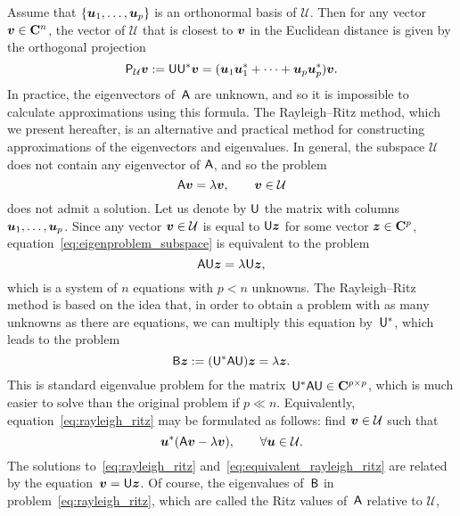 Assume that $\{\mathbf{\boldsymbol{u}}_1, \dotsc, \mathbf{\boldsymbol{u}}_p\}$ is an orthonormal basis of $\mathcal U$.
Then for any vector $\mathbf{\boldsymbol{v}} \in \mathbf C^{n}$,
the vector of $\mathcal U$ that is closest to $\mathbf{\boldsymbol{v}}$ in the Euclidean distance is given by the orthogonal projection
\[
    \mathsf P_{\mathcal U} \mathbf{\boldsymbol{v}} := \mathsf U \mathsf U^* \mathbf{\boldsymbol{v}} = (\mathbf{\boldsymbol{u}}_1 \mathbf{\boldsymbol{u}}_1^* + \dotsb + \mathbf{\boldsymbol{u}}_p \mathbf{\boldsymbol{u}}_p^*) \mathbf{\boldsymbol{v}}.
\]
In practice,
the eigenvectors of~$\mathsf A$ are unknown,
and so it is impossible to calculate approximations using this formula.
The Rayleigh--Ritz method,
which we present hereafter,
is an alternative and practical method for constructing approximations of the eigenvectors and eigenvalues.
In general, the subspace $\mathcal U$ does not contain any eigenvector of $\mathsf A$,
and so the problem
\begin{equation}
    \label{eq:eigenproblem_subspace}
    \mathsf A \mathbf{\boldsymbol{v}} = \lambda \mathbf{\boldsymbol{v}}, \qquad \mathbf{\boldsymbol{v}} \in \mathcal U
\end{equation}
does not admit a solution.
Let us denote by $\mathsf U$ the matrix with columns~$\mathbf{\boldsymbol{u}}_1, \dotsc, \mathbf{\boldsymbol{u}}_p$.
Since any vector $\mathbf{\boldsymbol{v}} \in \mathcal U$ is equal to $\mathsf U \mathbf{\boldsymbol{z}}$ for some vector $\mathbf{\boldsymbol{z}} \in \mathbf C^p$,
equation~\eqref{eq:eigenproblem_subspace} is equivalent to the problem
\[
    \mathsf A \mathsf U \mathbf{\boldsymbol{z}} = \lambda \mathsf U \mathbf{\boldsymbol{z}},
\]
which is a system of $n$ equations with $p < n$ unknowns.
The Rayleigh--Ritz method is based on the idea that,
in order to obtain a problem with as many unknowns as there are equations,
we can multiply this equation by~$\mathsf U^*$,
which leads to the problem
\begin{equation}
    \label{eq:rayleigh_ritz}
    \mathsf B \mathbf{\boldsymbol{z}} := (\mathsf U^* \mathsf A \mathsf U) \mathbf{\boldsymbol{z}} = \lambda \mathbf{\boldsymbol{z}}.
\end{equation}
This is standard eigenvalue problem for the matrix~$\mathsf U^* \mathsf A \mathsf U \in \mathbf C^{p \times p}$,
which is much easier to solve than the original problem if $p \ll n$.
Equivalently, equation~\eqref{eq:rayleigh_ritz} may be formulated as follows: find $\mathbf{\boldsymbol{v}} \in \mathcal U$
such that
\begin{equation}
    \label{eq:equivalent_rayleigh_ritz}
    \mathbf{\boldsymbol{u}}^* (\mathsf A \mathbf{\boldsymbol{v}} - \lambda \mathbf{\boldsymbol{v}}), \qquad \forall \mathbf{\boldsymbol{u}} \in \mathcal U.
\end{equation}
The solutions to~\eqref{eq:rayleigh_ritz} and~\eqref{eq:equivalent_rayleigh_ritz} are related by the equation~$\mathbf{\boldsymbol{v}} = \mathsf U \mathbf{\boldsymbol{z}}$.
Of course, the eigenvalues of~$\mathsf B$ in problem~\eqref{eq:rayleigh_ritz},
which are called the Ritz values of~$\mathsf A$ relative to $\mathcal U$,
